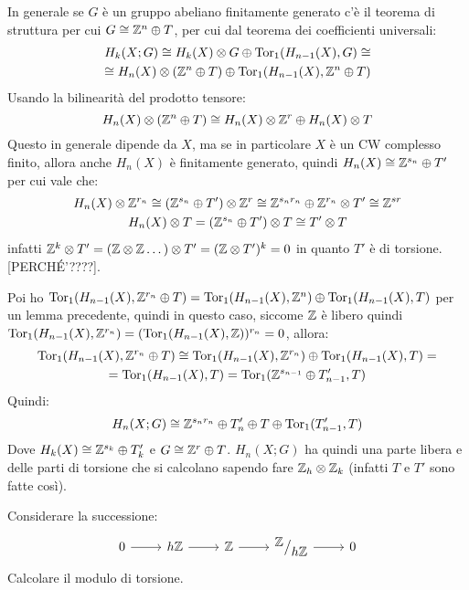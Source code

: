 \begin{osservation}
  In generale se $ G $ è un gruppo abeliano finitamente generato c'è il teorema di struttura
  per cui $ G \cong \mathbb{Z}^n \oplus T $, per cui dal teorema dei coefficienti universali:
  \begin{gather*}
    H_k(X;G) \cong H_k(X) \otimes G \oplus \mathrm{Tor_1}( H_{n-1}(X), G) \cong \\
    \cong H_n(X) \otimes (\mathbb{Z}^n \oplus T) \oplus \mathrm{Tor_1}( H_{n-1}(X), \mathbb{Z}^n \oplus T)
  \end{gather*}
  Usando la bilinearità del prodotto tensore:
  \[
    H_n(X) \otimes (\mathbb{Z}^n \oplus T) \cong H_n(X) \otimes \mathbb{Z}^r \oplus H_n(X) \otimes T
  \]
  Questo in generale dipende da $ X $, ma se in particolare $ X $ è un CW
  complesso finito, allora anche $ H_n(X) $ è finitamente generato, quindi
  $ H_n(X) \cong \mathbb{Z}^{s_n} \oplus T' $ per cui vale che:
  \begin{gather*}
    H_n(X) \otimes \mathbb{Z}^{r_n} \cong (\mathbb{Z}^{s_n} \oplus T') \otimes \mathbb{Z}^r \cong \mathbb{Z}^{s_n r_n} \oplus \mathbb{Z}^{r_n} \otimes T' \cong \mathbb{Z}^{sr} \\
    H_n(X) \otimes T = (\mathbb{Z}^{s_n} \oplus T') \otimes T \cong T' \otimes T
  \end{gather*}
  infatti
  $ \mathbb{Z}^k \otimes T' = (\mathbb{Z} \otimes \mathbb{Z} \dots ) \otimes T' = (\mathbb{Z} \otimes T')^k = 0 $ in quanto
  $ T' $ è di torsione. [PERCHÉ'????].

  Poi ho
  $ \mathrm{Tor_1}( H_{n-1}(X), \mathbb{Z}^{r_n} \oplus T) = \mathrm{Tor_1}( H_{n-1}(X), \mathbb{Z}^n) \oplus \mathrm{Tor_1}( H_{n-1}(X), T) $
  per un lemma precedente, quindi in questo caso, siccome $ \mathbb{Z} $ è libero quindi
  $ \mathrm{Tor_1}( H_{n-1}(X), \mathbb{Z}^{r_n}) = (\mathrm{Tor_1}( H_{n-1}(X), \mathbb{Z}))^{r_n} = 0 $, allora:
   \begin{gather*}
     \mathrm{Tor_1}( H_{n-1}(X), \mathbb{Z}^{r_n} \oplus T) \cong \mathrm{Tor_1}( H_{n-1}(X), \mathbb{Z}^{r_n}) \oplus \mathrm{Tor_1}( H_{n-1}(X), T) = \\
     = \mathrm{Tor_1}( H_{n-1}(X), T) = \mathrm{Tor_1}( \mathbb{Z}^{s_{n-1}} \oplus T'_{n-1}, T)
   \end{gather*}
   Quindi:
   \[
     H_n(X; G) \cong \mathbb{Z}^{s_n r_n} \oplus T_n' \oplus T \oplus \mathrm{Tor_1}( T_{n-1}', T)
   \]
   Dove $ H_k(X) \cong \mathbb{Z}^{s_k} \oplus T_k' $ e $ G \cong \mathbb{Z}^r \oplus T $.
   $ H_n(X;G) $ ha quindi una parte libera e delle parti di torsione che si calcolano
   sapendo fare $ \mathbb{Z}_h \otimes \mathbb{Z}_k $ (infatti $ T $ e $ T' $ sono fatte così).
 \end{osservation}

 \begin{exercise}
   Considerare la successione:
   \[
     \begin{tikzcd}
       0 \rar & h \Z \rar & \Z \rar & \quot{\Z}{h \Z} \rar & 0
     \end{tikzcd}
   \]
   Calcolare il modulo di torsione.
 \end{exercise}

